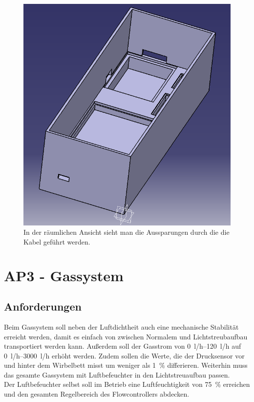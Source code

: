 \begin{figure}[h!]
	\begin{center}
		\includegraphics[scale=0.45]{Elektronik_Gehaeuse2.png}
		\caption[Gehäuse räumlich]{In der räumlichen Ansicht sieht man die Aussparungen durch die die Kabel geführt werden.}
	\end{center}
\end{figure}



\clearpage

\section{AP3 - Gassystem}

\subsection{Anforderungen}

Beim Gassystem soll neben der Luftdichtheit auch eine mechanische Stabilität erreicht werden, damit es einfach von zwischen Normalem und Lichtstreubaufbau transportiert werden kann. Außerdem soll der Gasstrom von \SIrange{0}{120}{l/h} auf \SIrange{0}{3000}{l/h} erhöht werden. Zudem sollen die Werte, die der Drucksensor vor und hinter dem Wirbelbett misst um weniger als \SI{1}{\%} differieren. Weiterhin muss das gesamte Gassystem mit Luftbefeuchter in den Lichtstreuaufbau passen. \\
Der Luftbefeuchter selbst soll im Betrieb eine Luftfeuchtigkeit von \SI{75}{\%} erreichen und den gesamten Regelbereich des Flowcontrollers abdecken.



